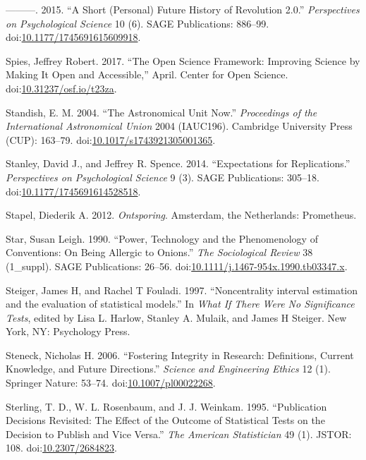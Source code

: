 \documentclass[a5paper]{book}
\begin{document}
\hypertarget{ref-doi:10.1177ux2f1745691615609918}{}
---------. 2015. ``A Short (Personal) Future History of Revolution
2.0.'' \emph{Perspectives on Psychological Science} 10 (6). SAGE
Publications: 886--99.
doi:\href{https://doi.org/10.1177/1745691615609918}{10.1177/1745691615609918}.

\hypertarget{ref-doi:10.31237ux2fosf.ioux2ft23za}{}
Spies, Jeffrey Robert. 2017. ``The Open Science Framework: Improving
Science by Making It Open and Accessible,'' April. Center for Open
Science.
doi:\href{https://doi.org/10.31237/osf.io/t23za}{10.31237/osf.io/t23za}.

\hypertarget{ref-doi:10.1017ux2fs1743921305001365}{}
Standish, E. M. 2004. ``The Astronomical Unit Now.'' \emph{Proceedings
of the International Astronomical Union} 2004 (IAUC196). Cambridge
University Press (CUP): 163--79.
doi:\href{https://doi.org/10.1017/s1743921305001365}{10.1017/s1743921305001365}.

\hypertarget{ref-doi:10.1177ux2f1745691614528518}{}
Stanley, David J., and Jeffrey R. Spence. 2014. ``Expectations for
Replications.'' \emph{Perspectives on Psychological Science} 9 (3). SAGE
Publications: 305--18.
doi:\href{https://doi.org/10.1177/1745691614528518}{10.1177/1745691614528518}.

\hypertarget{ref-isbn:9789044623123}{}
Stapel, Diederik A. 2012. \emph{Ontsporing}. Amsterdam, the Netherlands:
Prometheus.

\hypertarget{ref-doi:10.1111ux2fj.1467-954x.1990.tb03347.x}{}
Star, Susan Leigh. 1990. ``Power, Technology and the Phenomenology of
Conventions: On Being Allergic to Onions.'' \emph{The Sociological
Review} 38 (1\_suppl). SAGE Publications: 26--56.
doi:\href{https://doi.org/10.1111/j.1467-954x.1990.tb03347.x}{10.1111/j.1467-954x.1990.tb03347.x}.

\hypertarget{ref-Steiger1997-qq}{}
Steiger, James H, and Rachel T Fouladi. 1997. ``Noncentrality interval
estimation and the evaluation of statistical models.'' In \emph{What If
There Were No Significance Tests}, edited by Lisa L. Harlow, Stanley A.
Mulaik, and James H Steiger. New York, NY: Psychology Press.

\hypertarget{ref-doi:10.1007ux2fpl00022268}{}
Steneck, Nicholas H. 2006. ``Fostering Integrity in Research:
Definitions, Current Knowledge, and Future Directions.'' \emph{Science
and Engineering Ethics} 12 (1). Springer Nature: 53--74.
doi:\href{https://doi.org/10.1007/pl00022268}{10.1007/pl00022268}.

\hypertarget{ref-doi:10.2307ux2f2684823}{}
Sterling, T. D., W. L. Rosenbaum, and J. J. Weinkam. 1995. ``Publication
Decisions Revisited: The Effect of the Outcome of Statistical Tests on
the Decision to Publish and Vice Versa.'' \emph{The American
Statistician} 49 (1). JSTOR: 108.
doi:\href{https://doi.org/10.2307/2684823}{10.2307/2684823}.
\end{document}
